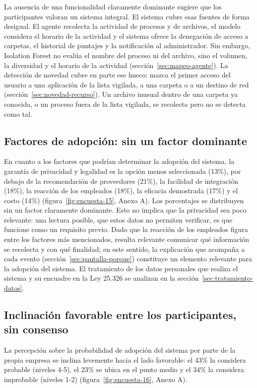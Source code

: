 La ausencia de una funcionalidad claramente dominante sugiere que los participantes valoran un sistema integral. El sistema cubre esas fuentes de forma desigual. El agente recolecta la actividad de procesos y de archivos, el modelo considera el horario de la actividad y el sistema ofrece la denegación de acceso a carpetas, el historial de puntajes y la notificación al administrador. Sin embargo, Isolation Forest no evalúa el nombre del proceso ni del archivo, sino el volumen, la diversidad y el horario de la actividad (sección~\ref{sec:mapeo-agente}). La detección de novedad cubre en parte ese hueco: marca el primer acceso del usuario a una aplicación de la lista vigilada, a una carpeta o a un destino de red (sección~\ref{sec:novedad-recurso}). Un archivo inusual dentro de una carpeta ya conocida, o un proceso fuera de la lista vigilada, se recolecta pero no se detecta como tal.

\subsection{Factores de adopción: sin un factor dominante}

En cuanto a los factores que podrían determinar la adopción del sistema, la garantía de privacidad y legalidad es la opción menos seleccionada (13\%), por debajo de la recomendación de proveedores (21\%), la facilidad de integración (18\%), la reacción de los empleados (18\%), la eficacia demostrada (17\%) y el costo (14\%) (figura~\ref{fig:encuesta-15}, Anexo A). Los porcentajes se distribuyen sin un factor claramente dominante. Esto no implica que la privacidad sea poco relevante: una lectura posible, que estos datos no permiten verificar, es que funcione como un requisito previo. Dado que la reacción de los empleados figura entre los factores más mencionados, resulta relevante comunicar qué información se recolecta y con qué finalidad; en este sentido, la explicación que acompaña a cada evento (sección~\ref{sec:pantalla-porque}) constituye un elemento relevante para la adopción del sistema. El tratamiento de los datos personales que realiza el sistema y su encuadre en la Ley 25.326 se analizan en la sección~\ref{sec:tratamiento-datos}.

\subsection{Inclinación favorable entre los participantes, sin consenso}

La percepción sobre la probabilidad de adopción del sistema por parte de la propia empresa se inclina levemente hacia el lado favorable: el 43\% la considera probable (niveles 4-5), el 23\% se ubica en el punto medio y el 34\% la considera improbable (niveles 1-2) (figura~\ref{fig:encuesta-16}, Anexo A).

